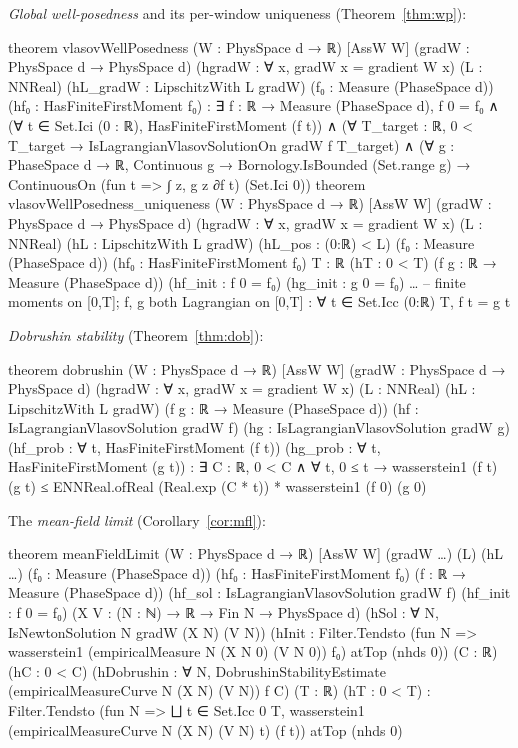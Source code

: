 \documentclass[11pt]{article}
\theoremstyle{plain}
\theoremstyle{definition}
\theoremstyle{remark}
\begin{document}
\noindent \emph{Global well-posedness} and its per-window uniqueness (Theorem~\ref{thm:wp}):
\begin{leancode}
theorem vlasovWellPosedness (W : PhysSpace d → ℝ) [AssW W]
    (gradW : PhysSpace d → PhysSpace d) (hgradW : ∀ x, gradW x = gradient W x)
    (L : NNReal) (hL_gradW : LipschitzWith L gradW)
    (f₀ : Measure (PhaseSpace d)) (hf₀ : HasFiniteFirstMoment f₀) :
    ∃ f : ℝ → Measure (PhaseSpace d), f 0 = f₀ ∧
      (∀ t ∈ Set.Ici (0 : ℝ), HasFiniteFirstMoment (f t)) ∧
      (∀ T_target : ℝ, 0 < T_target →
        IsLagrangianVlasovSolutionOn gradW f T_target) ∧
      (∀ g : PhaseSpace d → ℝ, Continuous g → Bornology.IsBounded (Set.range g) →
        ContinuousOn (fun t => ∫ z, g z ∂f t) (Set.Ici 0))
theorem vlasovWellPosedness_uniqueness (W : PhysSpace d → ℝ) [AssW W]
    (gradW : PhysSpace d → PhysSpace d) (hgradW : ∀ x, gradW x = gradient W x)
    (L : NNReal) (hL : LipschitzWith L gradW) (hL_pos : (0:ℝ) < L)
    (f₀ : Measure (PhaseSpace d)) (hf₀ : HasFiniteFirstMoment f₀)
    {T : ℝ} (hT : 0 < T) (f g : ℝ → Measure (PhaseSpace d))
    (hf_init : f 0 = f₀) (hg_init : g 0 = f₀)
    …    -- finite moments on [0,T]; f, g both Lagrangian on [0,T]
    : ∀ t ∈ Set.Icc (0:ℝ) T, f t = g t
\end{leancode}

\noindent \emph{Dobrushin stability} (Theorem~\ref{thm:dob}):
\begin{leancode}
theorem dobrushin (W : PhysSpace d → ℝ) [AssW W]
    (gradW : PhysSpace d → PhysSpace d) (hgradW : ∀ x, gradW x = gradient W x)
    (L : NNReal) (hL : LipschitzWith L gradW)
    (f g : ℝ → Measure (PhaseSpace d))
    (hf : IsLagrangianVlasovSolution gradW f)
    (hg : IsLagrangianVlasovSolution gradW g)
    (hf_prob : ∀ t, HasFiniteFirstMoment (f t))
    (hg_prob : ∀ t, HasFiniteFirstMoment (g t)) :
    ∃ C : ℝ, 0 < C ∧ ∀ t, 0 ≤ t →
      wasserstein1 (f t) (g t) ≤
        ENNReal.ofReal (Real.exp (C * t)) * wasserstein1 (f 0) (g 0)
\end{leancode}

\noindent The \emph{mean-field limit} (Corollary~\ref{cor:mfl}):
\begin{leancode}
theorem meanFieldLimit (W : PhysSpace d → ℝ) [AssW W] (gradW …) (L) (hL …)
    (f₀ : Measure (PhaseSpace d)) (hf₀ : HasFiniteFirstMoment f₀)
    (f : ℝ → Measure (PhaseSpace d)) (hf_sol : IsLagrangianVlasovSolution gradW f)
    (hf_init : f 0 = f₀)
    (X V : (N : ℕ) → ℝ → Fin N → PhysSpace d)
    (hSol : ∀ N, IsNewtonSolution N gradW (X N) (V N))
    (hInit : Filter.Tendsto
      (fun N => wasserstein1 (empiricalMeasure N (X N 0) (V N 0)) f₀) atTop (nhds 0))
    (C : ℝ) (hC : 0 < C)
    (hDobrushin : ∀ N, DobrushinStabilityEstimate
      (empiricalMeasureCurve N (X N) (V N)) f C)
    (T : ℝ) (hT : 0 < T) :
    Filter.Tendsto (fun N => ⨆ t ∈ Set.Icc 0 T,
      wasserstein1 (empiricalMeasureCurve N (X N) (V N) t) (f t)) atTop (nhds 0)
\end{leancode}
\end{document}
